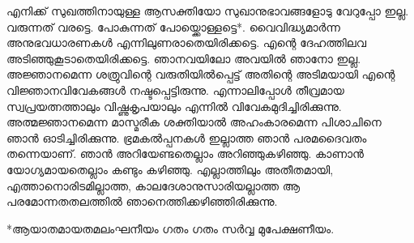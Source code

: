 എനിക്ക് സുഖത്തിനായുള്ള ആസക്തിയോ സുഖാനുഭാവങ്ങളോടു വേറുപ്പോ ഇല്ല. വരുന്നത് വരട്ടെ. പോകുന്നത് പോയ്ക്കൊള്ളട്ടെ*. വൈവിദ്ധ്യമാര്‍ന്ന അനുഭവധാരണകള്‍ എന്നിലുണരാതെയിരിക്കട്ടെ. എന്റെ ദേഹത്തിലവ അടിഞ്ഞുകൂടാതെയിരിക്കട്ടെ. ഞാനവയിലോ അവയില്‍ ഞാനോ ഇല്ല. അജ്ഞാനമെന്ന ശത്രുവിന്റെ വരുതിയില്‍പ്പെട്ട് അതിന്റെ അടിമയായി എന്റെ വിജ്ഞാനവിവേകങ്ങള്‍ നഷ്ടപ്പെട്ടിരുന്നു. എന്നാലിപ്പോള്‍ തീവ്രമായ സ്വപ്രയത്നത്താലും വിഷ്ണുകൃപയാലും എന്നില്‍ വിവേകമുദിച്ചിരിക്കുന്നു. അത്മജ്ഞാനമെന്ന മാസ്മരീക ശക്തിയാല്‍ അഹംകാരമെന്ന പിശാചിനെ ഞാന്‍ ഓടിച്ചിരിക്കുന്നു. ഭ്രമകല്‍പ്പനകള്‍ ഇല്ലാത്ത ഞാന്‍ പരമദൈവതം തന്നെയാണ്. ഞാന്‍ അറിയേണ്ടതെല്ലാം അറിഞ്ഞുകഴിഞ്ഞു. കാണാന്‍ യോഗ്യമായതെല്ലാം കണ്ടും കഴിഞ്ഞു. എല്ലാത്തിലും അതീതമായി, എത്താനൊരിടമില്ലാത്ത, കാലദേശാനുസാരിയല്ലാത്ത  ആ പരമോന്നതതലത്തില്‍ ഞാനെത്തിക്കഴിഞ്ഞിരിക്കുന്നു.

*ആയാതമായതമലംഘനീയം ഗതം ഗതം സര്‍വ്വ മുപേക്ഷണീയം.